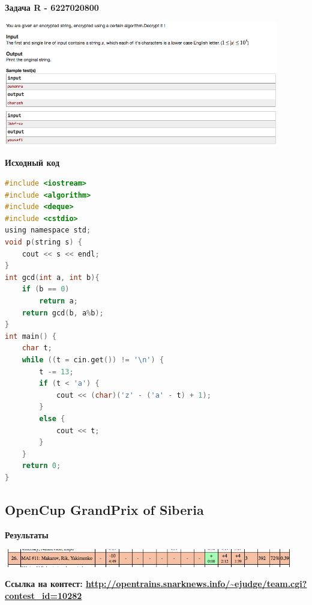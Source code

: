 \documentclass[a4paper,12pt]{article}
\begin{document}
\newpage
\textbf{{\large Задача R - 6227020800}}

\begin{center}
\includegraphics[width=0.9\textwidth]{CT_Crypto/CT_Crypto_R.png}\\ [1cm]
\end{center}

\textbf{{\large Исходный код}} \\
\begin{lstlisting}[language=C]
#include <iostream>
#include <algorithm>
#include <deque>
#include <cstdio>
using namespace std;
void p(string s) {
	cout << s << endl;
}
int gcd(int a, int b){
    if (b == 0)
        return a;
    return gcd(b, a%b);
}
int main() {
	char t;
	while ((t = cin.get()) != '\n') {
		t -= 13;
		if (t < 'a') {
			cout << (char)('z' - ('a' - t) + 1);
		}
		else {
			cout << t;
		}
	}
	return 0;
}
\end{lstlisting}



%
%
\newpage
\subsection{OpenCup GrandPrix of Siberia}

\textbf{{\large Результаты}} \\
\begin{center}
\includegraphics[width=0.95\textwidth]{OC_Siberia/OC_Siberia_result.png}\\ [1cm]
\end{center}

\textbf{{\large Ссылка на контест: \url{http://opentrains.snarknews.info/~ejudge/team.cgi?contest_id=10282}}}
\end{document}
